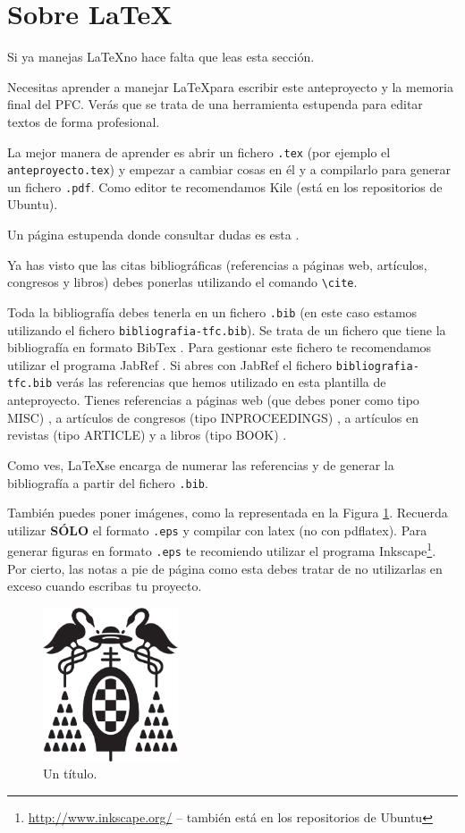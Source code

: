 \documentclass[12pt,oneside,a4paper]{article}
\begin{document}
\section{Sobre \LaTeX}

Si ya manejas \LaTeX no hace falta que leas esta sección.

Necesitas aprender a manejar \LaTeX para escribir este anteproyecto y la memoria final del PFC. Verás que se trata de una herramienta estupenda para editar textos de forma profesional.

La mejor manera de aprender es abrir un fichero \verb$.tex$ (por ejemplo el \verb$anteproyecto.tex$) y empezar a cambiar cosas en él y a compilarlo para generar un fichero \verb$.pdf$. Como editor te recomendamos Kile \cite{kile} (está en los repositorios de Ubuntu).

Un página estupenda donde consultar dudas es esta \cite{wikibook}.

Ya has visto que las citas bibliográficas (referencias a páginas web, artículos, congresos y libros) debes ponerlas utilizando el comando \verb$\cite$.

Toda la bibliografía debes tenerla en un fichero \verb$.bib$ (en este caso estamos utilizando el fichero \verb$bibliografia-tfc.bib$). Se trata de un fichero que tiene la bibliografía en formato BibTex \cite{bibtex}. Para gestionar este fichero te recomendamos utilizar el programa JabRef \cite{jabref}. Si abres con JabRef el fichero \verb$bibliografia-tfc.bib$ verás las referencias que hemos utilizado en esta plantilla de anteproyecto. Tienes referencias a páginas web (que debes poner como tipo MISC) \cite{bibtex,jabref,wikibook}, a artículos de congresos (tipo INPROCEEDINGS) \cite{Lowe1999}, a artículos en revistas (tipo ARTICLE) \cite{Tuytelaars2008} y a libros (tipo BOOK) \cite{hartley2006}.

Como ves, \LaTeX se encarga de numerar las referencias y de generar la bibliografía a partir del fichero \verb$.bib$.

También puedes poner imágenes, como la representada en la Figura \ref{fig:ejemplo}. Recuerda utilizar \textbf{SÓLO} el formato \verb$.eps$ y compilar con latex (no con pdflatex). Para generar figuras en formato \verb$.eps$ te recomiendo utilizar el programa Inkscape\footnote{\url{http://www.inkscape.org/} -- también está en los repositorios de Ubuntu}. Por cierto, las notas a pie de página como esta debes tratar de no utilizarlas en exceso cuando escribas tu proyecto.

\begin{figure}
  \centering
  \includegraphics[width=4cm]{figuras/logo-uah.eps}
  \caption{Un título.}
  \label{fig:ejemplo}
\end{figure}




\end{document}
